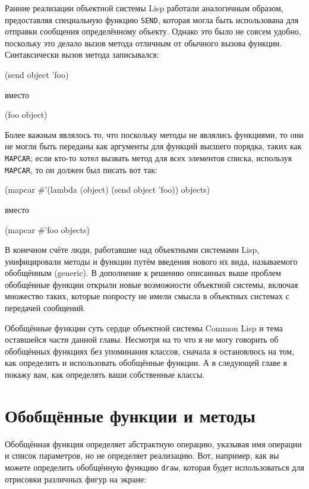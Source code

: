 Ранние реализации объектной системы Lisp работали аналогичным образом, предоставляя
специальную функцию \lstinline{SEND}, которая могла быть использована для отправки сообщения
определённому объекту.  Однако это было не совсем удобно, поскольку это делало вызов
метода отличным от обычного вызова функции.  Синтаксически вызов метода записывался:

\begin{myverb}
  (send object 'foo)
\end{myverb}

\noindent{}вместо

\begin{myverb}
  (foo object)
\end{myverb}

Более важным являлось то, что поскольку методы не являлись функциями, то они не могли быть
переданы как аргументы для функций высшего порядка, таких как \lstinline{MAPCAR}; если кто-то
хотел вызвать метод для всех элементов списка, используя \lstinline{MAPCAR}, то он должен был
писать вот так:

\begin{myverb}
  (mapcar #'(lambda (object) (send object 'foo)) objects)
\end{myverb}

\noindent{}вместо

\begin{myverb}
  (mapcar #'foo objects)
\end{myverb}

В конечном счёте люди, работавшие над объектными системами Lisp, унифицировали методы и
функции путём введения нового их вида, называемого обобщённым (generic).  В дополнение к
решению описанных выше проблем обобщённые функции открыли новые возможности объектной
системы, включая множество таких, которые попросту не имели смысла в объектных системах с
передачей сообщений.

Обобщённые функции суть сердце объектной системы Common Lisp и тема оставшейся части
данной главы.  Несмотря на то что я не могу говорить об обобщённых функциях без
упоминания классов, сначала я остановлюсь на том, как определить и использовать обобщённые
функции.  А в следующей главе я покажу вам, как определять ваши собственные классы.

\section{Обобщённые функции и методы}

Обобщённая функция определяет абстрактную операцию, указывая имя операции и список
параметров, но не определяет реализацию.  Вот, например, как вы можете определить
обобщённую функцию \lstinline{draw}, которая будет использоваться для отрисовки различных фигур
на экране:

